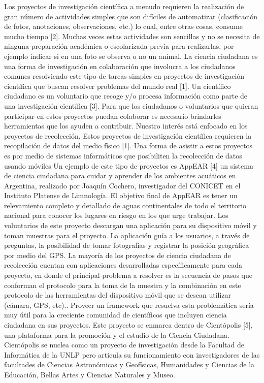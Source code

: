 Los proyectos de investigación científica a menudo requieren la realización de gran número de actividades simples que son difíciles de automatizar (clasificación de fotos, anotaciones, observaciones, etc.) lo cual, entre otras cosas, consume mucho tiempo [2]. Muchas veces estas actividades son sencillas y no se necesita de ninguna preparación académica o escolarizada previa para realizarlas, por ejemplo indicar si en una foto se observa o no un animal. La ciencia ciudadana es una forma de investigación en colaboración que involucra a los ciudadanos comunes resolviendo este tipo de tareas simples en proyectos de investigación científica que buscan resolver problemas del mundo real [1]. Un científico ciudadano es un voluntario que recoge y/o procesa información como parte de una investigación científica [3]. Para que los ciudadanos o voluntarios que quieran participar en estos proyectos puedan colaborar es necesario brindarles herramientas que los ayuden a contribuir. 
Nuestro interés está enfocado en los proyectos de recolección. Estos proyectos de investigación científica requieren la recopilación de datos del medio físico [1]. Una forma de asistir a estos proyectos es por medio de sistemas informáticos que posibiliten la recolección de datos usando móviles
Un ejemplo de este tipo de proyectos es AppEAR [4] un sistema de ciencia ciudadana para cuidar y aprender de los ambientes acuáticos en Argentina, realizado por Joaquín Cochero, investigador del CONICET en el Instituto Platense de Limnología. El objetivo final de AppEAR es tener un relevamiento completo y detallado de aguas continentales de todo el territorio nacional para conocer los lugares en riesgo en los que urge trabajar. Los voluntarios de este proyecto descargan una aplicación para su dispositivo móvil y toman muestras para el proyecto. La aplicación guía a los usuarios, a través de preguntas, la posibilidad de tomar fotografías y registrar la posición geográfica por medio del GPS.
La mayoría de los proyectos de ciencia ciudadana de recolección cuentan con aplicaciones desarrolladas específicamente para cada proyecto, en donde el principal problema a resolver es la secuencia de pasos que conforman el protocolo para la toma de la muestra y la combinación en este protocolo de las herramientas del dispositivo móvil que se desean utilizar (cámara, GPS, etc).. Proveer un framework que resuelva esta problemática  sería muy útil para la creciente comunidad de científicos que incluyen ciencia ciudadana en sus proyectos.
Este proyecto se enmarca dentro de Cientópolis [5], una plataforma para la promoción y el estudio de la Ciencia Ciudadana. Cientópolis se nuclea como un proyecto de investigación desde la Facultad de Informática de la UNLP pero articula su funcionamiento con investigadores de las facultades de Ciencias Astronómicas y Geofísicas, Humanidades y Ciencias de la Educación, Bellas Artes y Ciencias Naturales y Museo.

